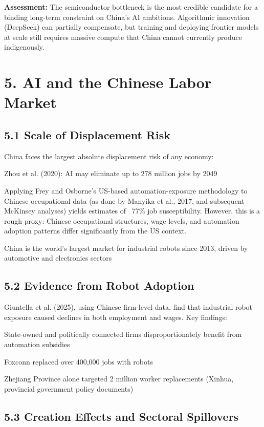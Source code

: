 \documentclass[11pt,a4paper]{article}
\begin{document}
\textbf{Assessment:} The semiconductor bottleneck is the most credible candidate for a binding long-term constraint on China's AI ambitions. Algorithmic innovation (DeepSeek) can partially compensate, but training and deploying frontier models at scale still requires massive compute that China cannot currently produce indigenously.


\section{5. AI and the Chinese Labor Market}

\subsection{5.1 Scale of Displacement Risk}

China faces the largest absolute displacement risk of any economy:
\item Zhou et al. (2020): AI may eliminate up to 278 million jobs by 2049
\item Applying Frey and Osborne's US-based automation-exposure methodology to Chinese occupational data (as done by Manyika et al., 2017, and subsequent McKinsey analyses) yields estimates of ~77\% job susceptibility. However, this is a rough proxy: Chinese occupational structures, wage levels, and automation adoption patterns differ significantly from the US context.
\item China is the world's largest market for industrial robots since 2013, driven by automotive and electronics sectors

\subsection{5.2 Evidence from Robot Adoption}

Giuntella et al. (2025), using Chinese firm-level data, find that industrial robot exposure caused declines in both employment and wages. Key findings:
\item State-owned and politically connected firms disproportionately benefit from automation subsidies
\item Foxconn replaced over 400,000 jobs with robots
\item Zhejiang Province alone targeted 2 million worker replacements (Xinhua, provincial government policy documents)

\subsection{5.3 Creation Effects and Sectoral Spillovers}
\end{document}

